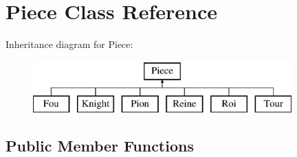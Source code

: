 \hypertarget{class_piece}{}\section{Piece Class Reference}
\label{class_piece}
Inheritance diagram for Piece\+:\begin{figure}[H]
\begin{center}
\leavevmode
\includegraphics[height=2.000000cm]{class_piece}
\end{center}
\end{figure}
\subsection*{Public Member Functions}
